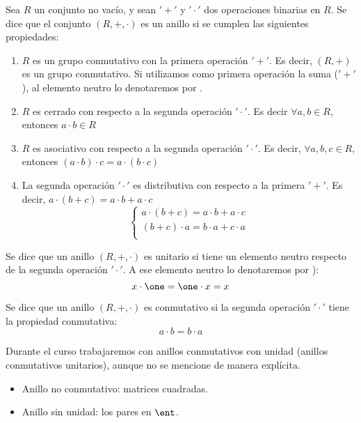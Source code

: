 \begin{defn}[Anillo]
Sea $R$ un conjunto no vacío, y sean $'+'$ y $'\cdot'$ dos operaciones binarias en $R$. Se dice que el conjunto $(R, +, \cdot )$ es un anillo si se cumplen las siguientes propiedades:

\begin{enumerate}
	\item $R$ es un grupo conmutativo con la primera operación $'+'$. Es decir, $(R,+)$ es un grupo conmutativo. Si utilizamos como primera operación la suma ($'+'$), al elemento neutro lo denotaremos por \zero.
	\item $R$ es cerrado con respecto a la segunda operación $'\cdot'$. Es decir $\forall a,b \in R$, entonces $a \cdot b \in R$
	\item $R$ es asociativo con respecto a la segunda operación $'\cdot'$. Es decir, $\forall a,b,c \in R$, entonces $(a\cdot b) \cdot c = a \cdot (b \cdot c)$
	\item La segunda operación $'\cdot'$ es distributiva con respecto a la primera $'+'$. Es decir, $a \cdot (b+c) = a\cdot b + a \cdot c$
	\[
	\left\{ \begin{array}{c}
	a \cdot (b+c) = a\cdot b + a \cdot c \\
	(b+c) \cdot a = b\cdot a + c\cdot a \\
	\end{array}
	\right.
	\]
\end{enumerate}
\end{defn}


\begin{defn}
	Se dice que un anillo $(R, +, \cdot)$ es unitario si tiene un elemento neutro respecto de la segunda operación $'\cdot'$. A ese elemento neutro lo denotaremos por \one):
	\[ x\cdot \one = \one \cdot x = x \]
\end{defn}

\begin{defn}
Se dice que un anillo $(R, +, \cdot)$ es conmutativo si la segunda operación $'\cdot'$ tiene la propiedad conmutativa:
\[ a\cdot b = b\cdot a \]
\end{defn}


\nota Durante el curso trabajaremos con anillos conmutativos con unidad (anillos conmutativos unitarios), aunque no se mencione de manera explícita.

\begin{example}
\begin{itemize}
	\item Anillo no conmutativo: matrices cuadradas.
	\item Anillo sin unidad: los pares en $\ent$.
\end{itemize}
\end{example}



